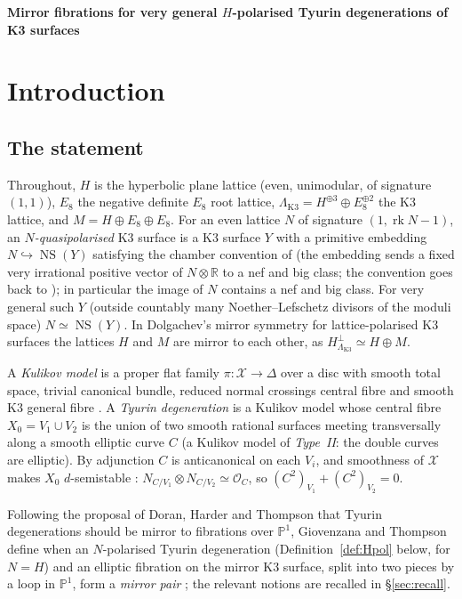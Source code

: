 \documentclass[12pt]{article}
\newcommand{\PP}{\mathbb P}
\newcommand{\NS}{\operatorname{NS}}
\newcommand{\rk}{\operatorname{rk}}
\newcommand{\calX}{\mathcal X}
\newcommand{\LK}{\Lambda_{\mathrm{K3}}}
\theoremstyle{definition}
\theoremstyle{remark}
\begin{document}
\begin{center}
\textbf{Mirror fibrations for very general \(H\)-polarised Tyurin
degenerations of K3 surfaces}
\end{center}

\section{Introduction}

\subsection{The statement}

Throughout, \(H\) is the hyperbolic plane lattice (even, unimodular,
of signature \((1,1)\)), \(E_8\) the negative definite \(E_8\) root
lattice, \(\LK=H^{\oplus3}\oplus E_8^{\oplus2}\) the K3 lattice, and
\(M=H\oplus E_8\oplus E_8\). For an even lattice \(N\) of signature
\((1,\rk N-1)\), an \emph{\(N\)-quasipolarised} K3 surface is a K3
surface \(Y\) with a primitive embedding \(N\hookrightarrow\NS(Y)\)
satisfying the chamber convention of \cite[Definition~3.19]{GT} (the
embedding sends a fixed very irrational positive vector of
\(N\otimes\mathbb R\) to a nef and big class; the convention goes back
to \cite{Do}); in particular the image of \(N\) contains a nef and big
class. For very general such \(Y\) (outside countably
many Noether--Lefschetz divisors of the moduli space)
\(N\simeq\NS(Y)\). In Dolgachev's mirror symmetry for
lattice-polarised K3 surfaces \cite{Do} the lattices \(H\) and \(M\)
are mirror to each other, as \(H^\perp_{\LK}\simeq H\oplus M\).

A \emph{Kulikov model} is a proper flat family
\(\pi\colon\calX\to\Delta\) over a disc with smooth total space,
trivial canonical bundle, reduced normal crossings central fibre and
smooth K3 general fibre \cite{Ku}. A \emph{Tyurin degeneration} is a
Kulikov model whose central fibre \(X_0=V_1\cup V_2\) is the union of
two smooth rational surfaces meeting transversally along a smooth
elliptic curve \(C\) (a Kulikov model of \emph{Type~II}: the double
curves are elliptic). By adjunction \(C\) is anticanonical on each
\(V_i\), and smoothness of \(\calX\) makes \(X_0\) \(d\)-semistable
\cite{Fr83}: \(N_{C/V_1}\otimes N_{C/V_2}\simeq\mathcal O_C\), so
\((C^2)_{V_1}+(C^2)_{V_2}=0\).

Following the proposal of Doran, Harder and Thompson \cite{DHT} that
Tyurin degenerations should be mirror to fibrations over \(\PP^1\),
Giovenzana and Thompson \cite{GT} define when an \(N\)-polarised
Tyurin degeneration (Definition~\ref{def:Hpol} below, for \(N=H\)) and
an elliptic fibration on the mirror K3 surface, split into two pieces
by a loop in \(\PP^1\), form a \emph{mirror pair}
\cite[Definition~5.1]{GT}; the relevant notions are recalled in
\S\ref{sec:recall}.
\end{document}
